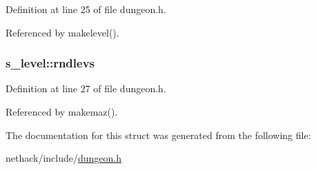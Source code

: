 Definition at line 25 of file dungeon.\+h.



Referenced by makelevel().

\hypertarget{structs__level_acad52c1c9c746baa47b9447bd7faa28f}{
\subsubsection[{rndlevs}]{ s\+\_\+level\+::rndlevs}}\label{structs__level_acad52c1c9c746baa47b9447bd7faa28f}


Definition at line 27 of file dungeon.\+h.



Referenced by makemaz().



The documentation for this struct was generated from the following file\+:\begin{DoxyCompactItemize}
\item 
nethack/include/\hyperlink{dungeon_8h}{dungeon.\+h}\end{DoxyCompactItemize}

